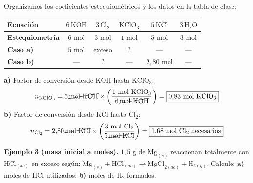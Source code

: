 \documentclass[12pt, letterpaper]{article}
\begin{document}
\begin{cuadrosolucion}[nobreak=true]
  \small
  Organizamos los coeficientes estequiométricos y los datos en la tabla de clase:
  \begin{center}
    \setlength{\tabcolsep}{7pt}
    \begin{tabular}{l|ccccc}
      \toprule
      \textbf{Ecuación} & $6\,\text{KOH}$ & $3\,\text{Cl}_2$ & $\text{KClO}_3$ & $5\,\text{KCl}$ & $3\,\text{H}_2\text{O}$ \\
      \midrule
      \textbf{Estequiometría} & $6\text{ mol}$ & $3\text{ mol}$ & $1\text{ mol}$ & $5\text{ mol}$ & $3\text{ mol}$ \\
      \textbf{Caso a)} & $5\text{ mol}$ & exceso & $?$ & — & — \\
      \textbf{Caso b)} & — & $?$ & — & $2{,}80\text{ mol}$ & — \\
      \bottomrule
    \end{tabular}
  \end{center}
  \textbf{a)} Factor de conversión desde $\text{KOH}$ hasta $\text{KClO}_3$:
  \[
    n_{\text{KClO}_3} = 5\,\cancel{\text{mol KOH}} \times \left(\frac{1\text{ mol KClO}_3}{6\,\cancel{\text{mol KOH}}}\right) = \boxed{0{,}83\text{ mol KClO}_3}
  \]
  \textbf{b)} Factor de conversión desde $\text{KCl}$ hasta $\text{Cl}_2$:
  \[
    n_{\text{Cl}_2} = 2{,}80\,\cancel{\text{mol KCl}} \times \left(\frac{3\text{ mol Cl}_2}{5\,\cancel{\text{mol KCl}}}\right) = \boxed{1{,}68\text{ mol Cl}_2\text{ necesarios}}
  \]
\end{cuadrosolucion}

\newpage
\noindent\textbf{Ejemplo 3 (masa inicial a moles).} $1{,}5\text{ g}$ de $\text{Mg}_{(s)}$ reaccionan totalmente con $\text{HCl}_{(ac)}$ en exceso según: $\text{Mg}_{(s)} + \text{HCl}_{(ac)} \longrightarrow \text{MgCl}_{2(ac)} + \text{H}_{2(g)}$. Calcule: \textbf{a)} moles de $\text{HCl}$ utilizados; \textbf{b)} moles de $\text{H}_2$ formados.
\end{document}
